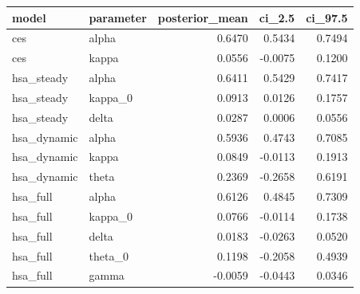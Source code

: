 \begin{tabular}{llrrr}
\toprule
model & parameter & posterior\_mean & ci\_2.5 & ci\_97.5 \\
\midrule
ces & alpha & 0.6470 & 0.5434 & 0.7494 \\
ces & kappa & 0.0556 & -0.0075 & 0.1200 \\
hsa\_steady & alpha & 0.6411 & 0.5429 & 0.7417 \\
hsa\_steady & kappa\_0 & 0.0913 & 0.0126 & 0.1757 \\
hsa\_steady & delta & 0.0287 & 0.0006 & 0.0556 \\
hsa\_dynamic & alpha & 0.5936 & 0.4743 & 0.7085 \\
hsa\_dynamic & kappa & 0.0849 & -0.0113 & 0.1913 \\
hsa\_dynamic & theta & 0.2369 & -0.2658 & 0.6191 \\
hsa\_full & alpha & 0.6126 & 0.4845 & 0.7309 \\
hsa\_full & kappa\_0 & 0.0766 & -0.0114 & 0.1738 \\
hsa\_full & delta & 0.0183 & -0.0263 & 0.0520 \\
hsa\_full & theta\_0 & 0.1198 & -0.2058 & 0.4939 \\
hsa\_full & gamma & -0.0059 & -0.0443 & 0.0346 \\
\bottomrule
\end{tabular}
